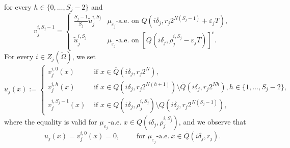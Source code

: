 \documentclass{article}
\theoremstyle{plain}
\theoremstyle{definition}
\newcommand{\ej}{\varepsilon_j}
\newcommand{\rj}{r_j}
\newcommand{\dej}{\delta_j}
\newcommand{\Q}
{\overline{Q}}
\numberwithin{equation}{section}
\begin{document}
for every $h\in\{0,\dots,S_j-2\}$ and 
\begin{equation*}
v^{i,S_j-1}_j=
     \begin{cases}
    \displaystyle\frac{S_j-1}{S_j}\widetilde{u}^{i,S_j}_j & \mu_{\ej} \text{-a.e. on }\Q(i\dej,\rj 2^{N(S_j-1)}+\ej T), \\[10pt]
\widetilde{u}_j^{i,S_j} & \mu_{\ej} \text{-a.e. on } [Q(i\dej, \rho_j^{i,S_j}-\ej T)]^c.
    \end{cases}
\end{equation*}
For every $i\in Z_j(\widetilde{\Omega})$, we set
\begin{equation*}
    u_j(x):=\begin{cases}
    v_j^{i,0}(x) & \text{ if } x\in \Q(i\dej, \rj 2^N), \\[3pt]
    v_j^{i,h}(x) & \text{ if } x\in Q(i\dej,\rj 2^{N(h+1)})\setminus \Q(i\dej, \rj2^{Nh}),  h\in\{1,\dots,S_j-2\}, \\[3pt]
     v_j^{i,S_j-1}(x) & \text{ if } x\in Q(i\dej,\rho_j^{i,S_j})\setminus Q(i\dej, \rj2^{N(S_j-1)}),
    \end{cases}
\end{equation*}
where the equality is valid for $\mu_{\ej}$-a.e. $x\in Q(i\dej, \rho_j^{i,S_j})$, and we observe that
\begin{equation}\label{limsup DBC dentro}
    u_j(x)=   v^{i,0}_j(x)=0, \qquad  \text{ for } \mu_{\ej}\text{-a.e.} \ x\in \Q(i\dej, \rj).
\end{equation}
\end{document}
